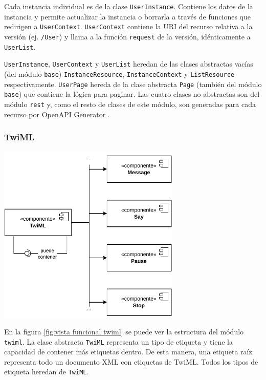 \documentclass{article}
\begin{document}
Cada instancia individual es de la clase \verb|UserInstance|.
Contiene los datos de la instancia
y permite actualizar la instancia o borrarla
a través de funciones que redirigen a \verb|UserContext|.
\verb|UserContext| contiene la URI del recurso relativa a la versión
(ej. \verb|/User|)
y llama a la función \verb|request| de la versión,
idénticamente a \verb|UserList|.

\verb|UserInstance|, \verb|UserContext| y \verb|UserList|
heredan de las clases abstractas vacías
(del módulo \verb|base|)
\verb|InstanceResource|, \verb|InstanceContext| y \verb|ListResource|
respectivamente.
\verb|UserPage| hereda de la clase abstracta
\verb|Page| (también del módulo \verb|base|)
que contiene la lógica para paginar.
Las cuatro clases no abstractas son del módulo \verb|rest|
y, como el resto de clases de este módulo,
son generadas para cada recurso por OpenAPI Generator
\cite{twilio-generated-openapi}.

\subsubsection{TwiML}

\begin{center}
  \includegraphics[width=0.65\textwidth]{VistaFuncionalTwiML.pdf}
  \label{fig:vista funcional twiml}
\end{center}

En la figura \ref{fig:vista funcional twiml}
se puede ver la estructura del módulo \verb|twiml|.
La clase abstracta \verb|TwiML| representa un tipo de etiqueta
y tiene la capacidad de contener más etiquetas dentro.
De esta manera, una etiqueta raíz
representa todo un documento XML con etiquetas de TwiML.
Todos los tipos de etiqueta heredan de \verb|TwiML|.
\end{document}
